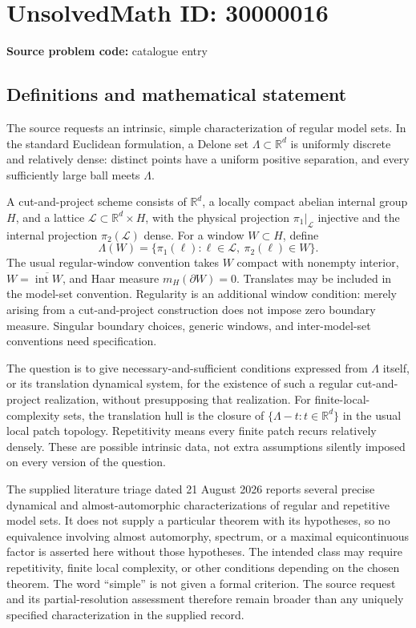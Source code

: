 \documentclass[11pt]{article}
\newcommand{\R}{\mathbb{R}}
\begin{document}
\section*{UnsolvedMath ID: 30000016}
\textbf{Source problem code:} catalogue entry
\subsection{Definitions and mathematical statement}
The source requests an intrinsic, simple characterization of regular model sets. In the standard Euclidean formulation, a Delone set \(\Lambda\subset\R^d\) is uniformly discrete and relatively dense: distinct points have a uniform positive separation, and every sufficiently large ball meets \(\Lambda\).

A cut-and-project scheme consists of \(\R^d\), a locally compact abelian internal group \(H\), and a lattice \(\mathcal L\subset\R^d\times H\), with the physical projection \(\pi_1|_{\mathcal L}\) injective and the internal projection \(\pi_2(\mathcal L)\) dense. For a window \(W\subset H\), define
\[
 \Lambda(W)=\{\pi_1(\ell):\ell\in\mathcal L,\ \pi_2(\ell)\in W\}.
\]
The usual regular-window convention takes \(W\) compact with nonempty interior, \(W=\overline{\operatorname{int}W}\), and Haar measure \(m_H(\partial W)=0\). Translates may be included in the model-set convention. Regularity is an additional window condition: merely arising from a cut-and-project construction does not impose zero boundary measure. Singular boundary choices, generic windows, and inter-model-set conventions need specification.

The question is to give necessary-and-sufficient conditions expressed from \(\Lambda\) itself, or its translation dynamical system, for the existence of such a regular cut-and-project realization, without presupposing that realization. For finite-local-complexity sets, the translation hull is the closure of \(\{\Lambda-t:t\in\R^d\}\) in the usual local patch topology. Repetitivity means every finite patch recurs relatively densely. These are possible intrinsic data, not extra assumptions silently imposed on every version of the question.

The supplied literature triage dated 21 August 2026 reports several precise dynamical and almost-automorphic characterizations of regular and repetitive model sets. It does not supply a particular theorem with its hypotheses, so no equivalence involving almost automorphy, spectrum, or a maximal equicontinuous factor is asserted here without those hypotheses. The intended class may require repetitivity, finite local complexity, or other conditions depending on the chosen theorem. The word ``simple'' is not given a formal criterion. The source request and its partial-resolution assessment therefore remain broader than any uniquely specified characterization in the supplied record.
\end{document}
